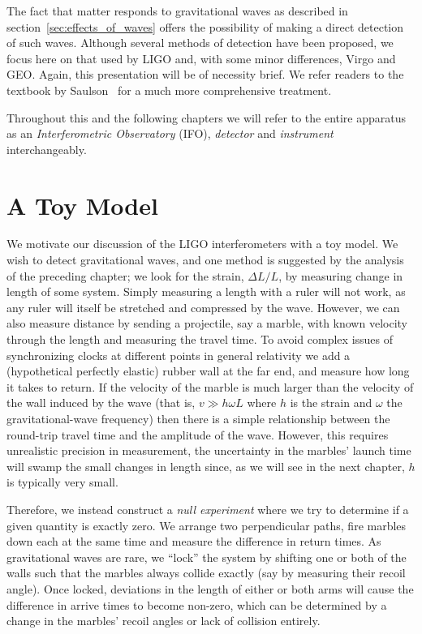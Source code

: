 The fact that matter responds to gravitational waves as described in
section~\ref{sec:effects_of_waves} offers the possibility of making a
direct detection of such waves.  Although several methods of detection
have been proposed, we focus here on that used by LIGO and, with some
minor differences, Virgo and GEO.  Again, this presentation will be of
necessity brief.  We refer readers to the textbook by
Saulson~\cite{Saulson:1994} for a much more comprehensive treatment.

Throughout this and the following chapters we will refer to 
the entire apparatus as an \emph{Interferometric Observatory}
(IFO), \emph{detector} and \emph{instrument} interchangeably.

\section{A Toy Model}

We motivate our discussion of the LIGO interferometers with a toy
model.  We wish to detect gravitational waves, and one method is
suggested by the analysis of the preceding chapter; we look for the
strain, $\Delta L/L$, by measuring change in length of some system.
Simply measuring a length with a ruler will not work, as any ruler
will itself be stretched and compressed by the wave.  However, we can
also measure distance by sending a projectile, say a marble, with
known velocity through the length and measuring the travel time.  To
avoid complex issues of synchronizing clocks at different points in
general relativity we add a (hypothetical perfectly elastic) rubber
wall at the far end, and measure how long it takes to return.  If the
velocity of the marble is much larger than the velocity of the wall
induced by the wave (that is, $v \gg h \omega L$ where $h$ is the
strain and $\omega$ the gravitational-wave frequency) then there is a
simple relationship between the round-trip travel time and the
amplitude of the wave.  However, this requires unrealistic precision
in measurement, the uncertainty in the marbles' launch time will swamp
the small changes in length since, as we will see in the next chapter,
$h$ is typically very small.

Therefore, we instead construct a \emph{null experiment} where we try
to determine if a given quantity is exactly zero.  We arrange two
perpendicular paths, fire marbles down each at the same time and
measure the difference in return times.  As gravitational waves are
rare, we ``lock'' the system by shifting one or both of the walls such
that the marbles always collide exactly (say by measuring their recoil
angle).  Once locked, deviations in the length of either or both arms
will cause the difference in arrive times to become non-zero, which
can be determined by a change in the marbles' recoil angles or lack of
collision entirely.

